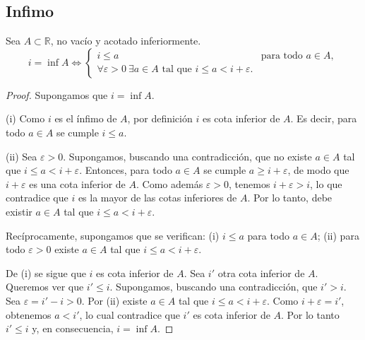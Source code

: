 \subsection{Infimo}
Sea $A \subset\mathbb{R}$, no vacío y acotado inferiormente.
\[
i = \inf A \Longleftrightarrow
\begin{cases}
i \le a & \text{para todo } a \in A,\\[4pt]
\forall \varepsilon > 0 \ \exists a \in A \text{ tal que } i \le a < i + \varepsilon.
\end{cases}
\]
\begin{proof}
Supongamos que $i = \inf A$.

(i) Como $i$ es el ínfimo de $A$, por definición $i$ es cota inferior de $A$.
Es decir, para todo $a \in A$ se cumple $i \le a$.

(ii) Sea $\varepsilon > 0$. Supongamos, buscando una contradicción, que no existe
$a \in A$ tal que $i \le a < i + \varepsilon$. Entonces, para todo $a \in A$
se cumple $a \ge i + \varepsilon$, de modo que $i + \varepsilon$ es una cota
inferior de $A$. Como además $\varepsilon>0$, tenemos $i + \varepsilon > i$,
lo que contradice que $i$ es la mayor de las cotas inferiores de $A$.
Por lo tanto, debe existir $a \in A$ tal que $i \le a < i + \varepsilon$.

Recíprocamente, supongamos que se verifican:
(i) $i \le a$ para todo $a \in A$;
(ii) para todo $\varepsilon>0$ existe $a \in A$ tal que $i \le a < i + \varepsilon$.

De (i) se sigue que $i$ es cota inferior de $A$.
Sea $i'$ otra cota inferior de $A$. Queremos ver que $i' \le i$.
Supongamos, buscando una contradicción, que $i' > i$.
Sea $\varepsilon = i' - i > 0$. Por (ii) existe $a \in A$ tal que
$i \le a < i + \varepsilon$. Como $i + \varepsilon = i'$, obtenemos
$a < i'$, lo cual contradice que $i'$ es cota inferior de $A$.
Por lo tanto $i' \le i$ y, en consecuencia, $i = \inf A$.
\end{proof}


